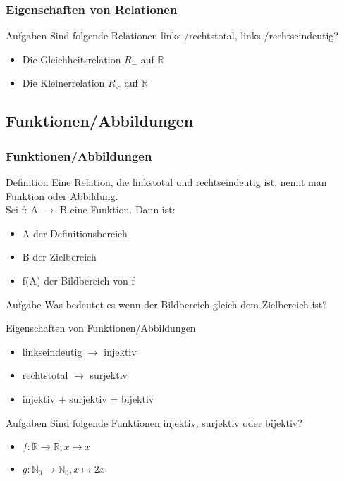 \documentclass{beamer}
\begin{document}
\begin{frame}
	\frametitle{Eigenschaften von Relationen}
	\begin{exampleblock}{Aufgaben}
		Sind folgende Relationen links-/rechtstotal, links-/rechtseindeutig?
		\begin{itemize}
			\item Die Gleichheitsrelation \(R_{=}\) auf $\mathbb R$
			\item Die Kleinerrelation \(R_{<}\) auf $\mathbb R$
		\end{itemize}
	\end{exampleblock}
\end{frame}

\subsection{Funktionen/Abbildungen}
\begin{frame}
	\frametitle{Funktionen/Abbildungen}
	\begin{block}{Definition}
		Eine Relation, die linkstotal und rechtseindeutig ist, nennt man Funktion 			oder Abbildung. \\
		Sei f: A $\rightarrow$ B eine Funktion. Dann ist:
		\begin{itemize}
			\item A der Definitionsbereich
			\item B der Zielbereich
			\item f(A) der Bildbereich von f
		\end{itemize}
	\end{block}
	\begin{exampleblock}{Aufgabe}
		Was bedeutet es wenn der Bildbereich gleich dem Zielbereich ist?
	\end{exampleblock}
	\end {frame}
	\begin {frame}
	\begin{block}{Eigenschaften von Funktionen/Abbildungen}
		\begin{itemize}
			\item linkseindeutig $\rightarrow$ injektiv
			\item rechtstotal $\rightarrow$ surjektiv
			\item injektiv + surjektiv = bijektiv
		\end{itemize}
	\end{block}
	\begin{exampleblock}{Aufgaben}
		Sind folgende Funktionen injektiv, surjektiv oder bijektiv?
		\begin{itemize}
			\item \(f:\mathbb R \rightarrow \mathbb R, x \mapsto x\)
			\item \(g:\mathbb N_{0} \rightarrow \mathbb N_{0}, x \mapsto 2x\)
		\end{itemize}
	\end{exampleblock}
\end{frame}
\end{document}
